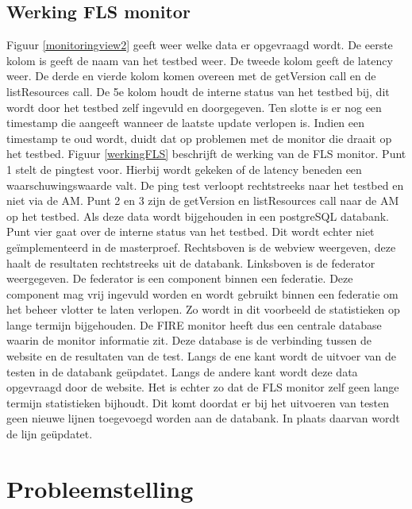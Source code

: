 \subsection{Werking FLS monitor}
\npar
Figuur \ref{monitoringview2} geeft weer welke data er opgevraagd wordt. 
De eerste kolom is geeft de naam van het testbed weer. De tweede kolom geeft de latency weer. De derde en vierde kolom komen overeen met de getVersion call en de listResources call. De 5e kolom houdt de interne status van het testbed bij, dit wordt door het testbed zelf ingevuld en doorgegeven. Ten slotte is er nog een timestamp die aangeeft wanneer de laatste update verlopen is. Indien een timestamp te oud wordt, duidt dat op problemen met de monitor die draait op het testbed.
\npar
Figuur \ref{werkingFLS} beschrijft de werking van de FLS monitor. Punt 1 stelt de pingtest voor. Hierbij wordt gekeken of de latency beneden een waarschuwingswaarde valt. De ping test verloopt rechtstreeks naar het testbed en niet via de AM. Punt 2 en 3 zijn de getVersion en listResources call naar de AM op het testbed. Als deze data wordt bijgehouden in een postgreSQL databank. Punt vier gaat over de interne status van het testbed. Dit wordt echter niet geïmplementeerd in de masterproef.
Rechtsboven is de webview weergeven, deze haalt de resultaten rechtstreeks uit de databank. Linksboven is de federator weergegeven. De federator is een component binnen een federatie. Deze component mag vrij ingevuld worden en wordt gebruikt binnen een federatie om het beheer vlotter te laten verlopen. Zo wordt in dit voorbeeld de statistieken op lange termijn bijgehouden.
\npar
De FIRE monitor heeft dus een centrale database waarin de monitor informatie zit. Deze database is de verbinding tussen de website en de resultaten van de test. Langs de ene kant wordt de uitvoer van de testen in de databank geüpdatet. Langs de andere kant wordt deze data opgevraagd door de website. Het is echter zo dat de FLS monitor zelf geen lange termijn statistieken bijhoudt. Dit komt doordat er bij het uitvoeren van testen geen nieuwe lijnen toegevoegd worden aan de databank. In plaats daarvan wordt de lijn geüpdatet.
\clearpage
\section{Probleemstelling}
